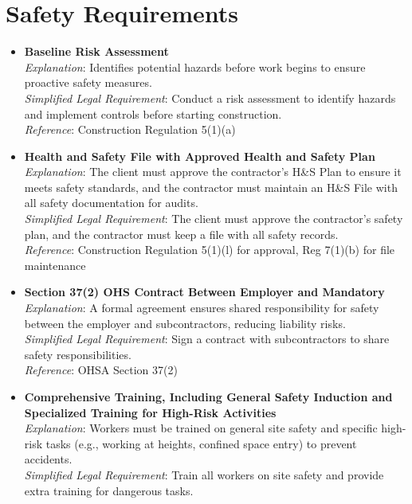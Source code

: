 \documentclass[11pt]{article}
\begin{document}
\section{Safety Requirements}
\begin{itemize}
  \item \textbf{Baseline Risk Assessment} \\
    \textit{Explanation}: Identifies potential hazards before work begins to ensure proactive safety measures. \\
    \textit{Simplified Legal Requirement}: Conduct a risk assessment to identify hazards and implement controls before starting construction. \\
    \textit{Reference}: Construction Regulation 5(1)(a)
  \item \textbf{Health and Safety File with Approved Health and Safety Plan} \\
    \textit{Explanation}: The client must approve the contractor’s H\&S Plan to ensure it meets safety standards, and the contractor must maintain an H\&S File with all safety documentation for audits. \\
    \textit{Simplified Legal Requirement}: The client must approve the contractor’s safety plan, and the contractor must keep a file with all safety records. \\
    \textit{Reference}: Construction Regulation 5(1)(l) for approval, Reg 7(1)(b) for file maintenance
  \item \textbf{Section 37(2) OHS Contract Between Employer and Mandatory} \\
    \textit{Explanation}: A formal agreement ensures shared responsibility for safety between the employer and subcontractors, reducing liability risks. \\
    \textit{Simplified Legal Requirement}: Sign a contract with subcontractors to share safety responsibilities. \\
    \textit{Reference}: OHSA Section 37(2)
  \item \textbf{Comprehensive Training, Including General Safety Induction and Specialized Training for High-Risk Activities} \\
    \textit{Explanation}: Workers must be trained on general site safety and specific high-risk tasks (e.g., working at heights, confined space entry) to prevent accidents. \\
    \textit{Simplified Legal Requirement}: Train all workers on site safety and provide extra training for dangerous tasks. \\

\end{itemize}
\end{document}
